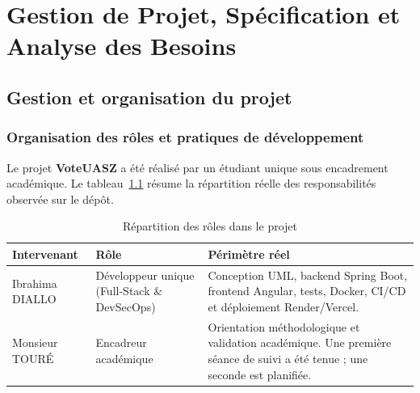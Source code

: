 \chapter{Gestion de Projet, Spécification et Analyse des Besoins}
\label{chap:1}

\section{Gestion et organisation du projet}

\subsection{Organisation des rôles et pratiques de développement}
Le projet \textbf{VoteUASZ} a été réalisé par un étudiant unique sous encadrement académique. Le tableau~\ref{tab:roles-projet} résume la répartition réelle des responsabilités observée sur le dépôt.

\begin{table}[H]
\centering
\caption{Répartition des rôles dans le projet}
\label{tab:roles-projet}
\small
\begin{tabularx}{\textwidth}{@{}llX@{}}
\toprule
\rowcolor{uaszlight}
\textbf{Intervenant} & \textbf{Rôle} & \textbf{Périmètre réel} \\
\midrule
Ibrahima DIALLO & Développeur unique (Full-Stack \& DevSecOps) & Conception UML, backend Spring Boot, frontend Angular, tests, Docker, CI/CD et déploiement Render/Vercel. \\
Monsieur TOURÉ & Encadreur académique & Orientation méthodologique et validation académique. Une première séance de suivi a été tenue ; une seconde est planifiée. \\
\bottomrule
\end{tabularx}
\end{table}

